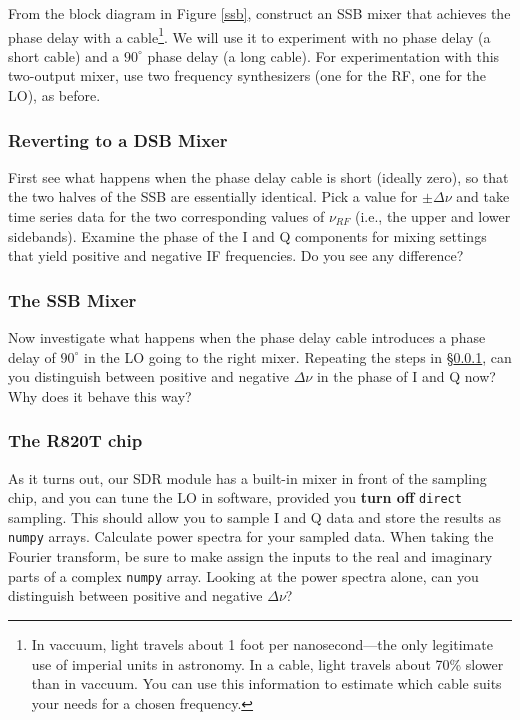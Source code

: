 \documentclass[11pt,preprint]{aastex}
\begin{document}
From the block diagram in Figure \ref{ssb}, construct an SSB mixer that
achieves the phase delay with a cable\footnote{In vaccuum, light travels
about 1 foot per nanosecond---the only legitimate use of
imperial units in astronomy. In a cable, light travels about
70\% slower than in vaccuum. You can use this information
to estimate which cable suits your
needs for a chosen frequency.}. We will use
it to experiment with no phase delay (a short cable) and a $90^\circ$
phase delay (a long cable).  For experimentation with this two-output
mixer, use two frequency synthesizers (one for the RF, one for the LO), as before.

\subsubsection{Reverting to a DSB Mixer} \label{dsbmixer}

\noindent
First see what happens when the phase delay cable is short (ideally
zero), so that the two halves of the SSB are essentially identical.
Pick a value for $\pm\Delta\nu$ and take time
series data for the two corresponding values of $\nu_{RF}$ (i.e., the
upper and lower sidebands). Examine the phase of the I and Q components
for mixing settings that yield positive and negative IF
frequencies. Do you see any difference?

\subsubsection{The SSB Mixer}

\noindent
Now investigate what happens when the phase delay cable introduces a 
phase delay of $90^\circ$ in the LO going to the right mixer.
Repeating the steps in \S \ref{dsbmixer},
can you distinguish between positive and negative
$\Delta\nu$ in the phase of I and Q now?
Why does it behave this way?

\subsubsection{The R820T chip}

As it turns out, our SDR module has a built-in mixer in front
of the sampling chip, and you can tune the LO in software,
provided you {\bf turn off} {\tt direct} sampling.
This should allow you to sample I and Q data and store the
results as {\tt numpy} arrays.
Calculate power spectra for your sampled data. When taking the
Fourier transform, be sure to make assign the inputs to the real and imaginary
parts of a complex {\tt numpy} array.
Looking at the power spectra alone, can you distinguish between positive and negative $\Delta
\nu$?
\end{document}
